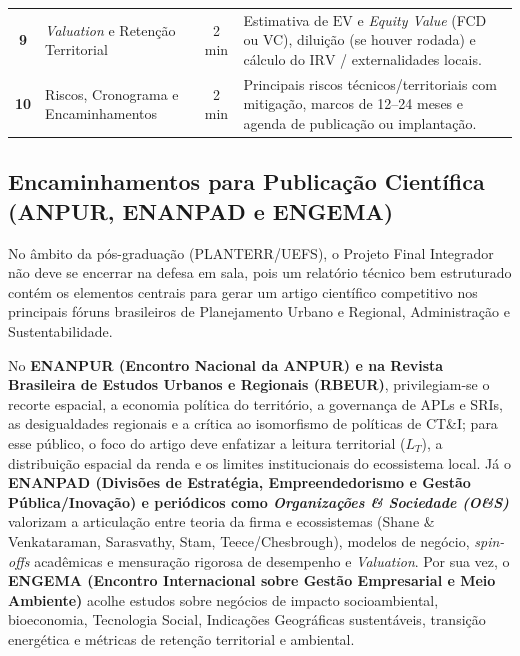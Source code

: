 \begin{table}[H]
\begin{tabularx}{\textwidth}{@{}c p{4.0cm} c >{\raggedright\arraybackslash}X@{}}
  \textbf{9} & \textit{Valuation} e Retenção Territorial & 2 min & Estimativa de $\text{EV}$ e \textit{Equity Value} (FCD ou VC), diluição (se houver rodada) e cálculo do $\text{IRV}$ / externalidades locais. \\
  \rowcolor{bgGray}
  \textbf{10} & Riscos, Cronograma e Encaminhamentos & 2 min & Principais riscos técnicos/territoriais com mitigação, marcos de 12–24 meses e agenda de publicação ou implantação. \\
  \bottomrule
\end{tabularx}
\end{table}

\subsection{Encaminhamentos para Publicação Científica (ANPUR, ENANPAD e ENGEMA)}

No âmbito da pós-graduação (PLANTERR/UEFS), o Projeto Final Integrador não deve se encerrar na defesa em sala, pois um relatório técnico bem estruturado contém os elementos centrais para gerar um artigo científico competitivo nos principais fóruns brasileiros de Planejamento Urbano e Regional, Administração e Sustentabilidade.

No \textbf{ENANPUR (Encontro Nacional da ANPUR) e na Revista Brasileira de Estudos Urbanos e Regionais (RBEUR)}, privilegiam-se o recorte espacial, a economia política do território, a governança de APLs e SRIs, as desigualdades regionais e a crítica ao isomorfismo de políticas de CT\&I; para esse público, o foco do artigo deve enfatizar a leitura territorial ($L_T$), a distribuição espacial da renda e os limites institucionais do ecossistema local. Já o \textbf{ENANPAD (Divisões de Estratégia, Empreendedorismo e Gestão Pública/Inovação) e periódicos como \textit{Organizações \& Sociedade (O\&S)}} valorizam a articulação entre teoria da firma e ecossistemas (Shane \& Venkataraman, Sarasvathy, Stam, Teece/Chesbrough), modelos de negócio, \textit{spin-offs} acadêmicas e mensuração rigorosa de desempenho e \textit{Valuation}. Por sua vez, o \textbf{ENGEMA (Encontro Internacional sobre Gestão Empresarial e Meio Ambiente)} acolhe estudos sobre negócios de impacto socioambiental, bioeconomia, Tecnologia Social, Indicações Geográficas sustentáveis, transição energética e métricas de retenção territorial e ambiental.

